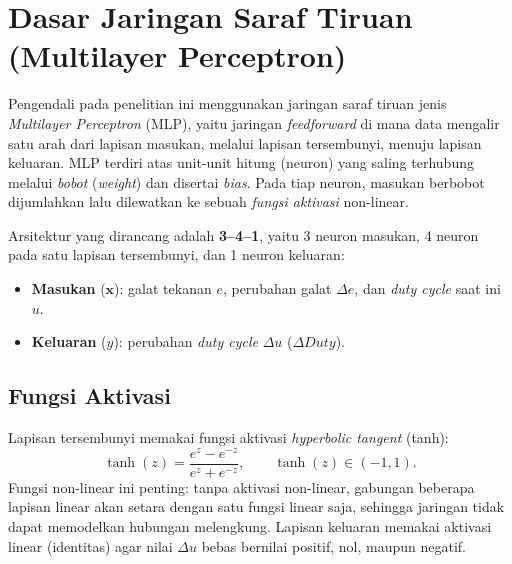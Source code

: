 ﻿%

\section{Dasar Jaringan Saraf Tiruan (Multilayer Perceptron)}
\label{sec:dasar-mlp}

Pengendali pada penelitian ini menggunakan jaringan saraf tiruan jenis
\emph{Multilayer Perceptron} (MLP), yaitu jaringan \emph{feedforward} di mana data
mengalir satu arah dari lapisan masukan, melalui lapisan tersembunyi, menuju lapisan
keluaran. MLP terdiri atas unit-unit hitung (neuron) yang saling terhubung melalui
\emph{bobot} (\emph{weight}) dan disertai \emph{bias}. Pada tiap neuron, masukan
berbobot dijumlahkan lalu dilewatkan ke sebuah \emph{fungsi aktivasi} non-linear.

Arsitektur yang dirancang adalah \textbf{3--4--1}, yaitu 3 neuron masukan, 4 neuron
pada satu lapisan tersembunyi, dan 1 neuron keluaran:
\begin{itemize}
  \item \textbf{Masukan} ($\mathbf{x}$): galat tekanan $e$, perubahan galat $\Delta e$,
        dan \emph{duty cycle} saat ini $u$.
  \item \textbf{Keluaran} ($y$): perubahan \emph{duty cycle} $\Delta u$ ($\Delta Duty$).
\end{itemize}

\subsection{Fungsi Aktivasi}
\label{sub:aktivasi}
Lapisan tersembunyi memakai fungsi aktivasi \emph{hyperbolic tangent} (tanh):
\begin{equation}
\tanh(z) = \frac{e^{z}-e^{-z}}{e^{z}+e^{-z}}, \qquad \tanh(z)\in(-1,1).
\label{eq:tanh}
\end{equation}
Fungsi non-linear ini penting: tanpa aktivasi non-linear, gabungan beberapa lapisan
linear akan setara dengan satu fungsi linear saja, sehingga jaringan tidak dapat
memodelkan hubungan melengkung. Lapisan keluaran memakai aktivasi linear (identitas)
agar nilai $\Delta u$ bebas bernilai positif, nol, maupun negatif.

